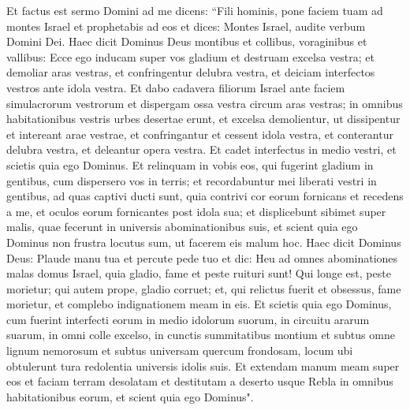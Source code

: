 \begin{biblechapter}  
\verse Et factus est sermo Domini ad me dicens: 
\verse “Fili hominis, pone faciem tuam ad montes Israel et prophetabis ad eos 
\verse et dices: Montes Israel, audite verbum Domini Dei. Haec dicit Dominus Deus montibus et collibus, voraginibus et vallibus: Ecce ego inducam super vos gladium et destruam excelsa vestra; 
\verse et demoliar aras vestras, et confringentur delubra vestra, et deiciam interfectos vestros ante idola vestra. 
\verse Et dabo cadavera filiorum Israel ante faciem simulacrorum vestrorum et dispergam ossa vestra circum aras vestras; 
\verse in omnibus habitationibus vestris urbes desertae erunt, et excelsa demolientur, ut dissipentur et intereant arae vestrae, et confringantur et cessent idola vestra, et conterantur delubra vestra, et deleantur opera vestra. 
\verse Et cadet interfectus in medio vestri, et scietis quia ego Dominus. 
\verse Et relinquam in vobis eos, qui fugerint gladium in gentibus, cum dispersero vos in terris; 
\verse et recordabuntur mei liberati vestri in gentibus, ad quas captivi ducti sunt, quia contrivi cor eorum fornicans et recedens a me, et oculos eorum fornicantes post idola sua; et displicebunt sibimet super malis, quae fecerunt in universis abominationibus suis, 
\verse et scient quia ego Dominus non frustra locutus sum, ut facerem eis malum hoc. 
\verse Haec dicit Dominus Deus: Plaude manu tua et percute pede tuo et dic: Heu ad omnes abominationes malas domus Israel, quia gladio, fame et peste ruituri sunt! 
\verse Qui longe est, peste morietur; qui autem prope, gladio corruet; et, qui relictus fuerit et obsessus, fame morietur, et complebo indignationem meam in eis. 
\verse Et scietis quia ego Dominus, cum fuerint interfecti eorum in medio idolorum suorum, in circuitu ararum suarum, in omni colle excelso, in cunctis summitatibus montium et subtus omne lignum nemorosum et subtus universam quercum frondosam, locum ubi obtulerunt tura redolentia universis idolis suis. 
\verse Et extendam manum meam super eos et faciam terram desolatam et destitutam a deserto usque Rebla in omnibus habitationibus eorum, et scient quia ego Dominus". 
\end{biblechapter}


